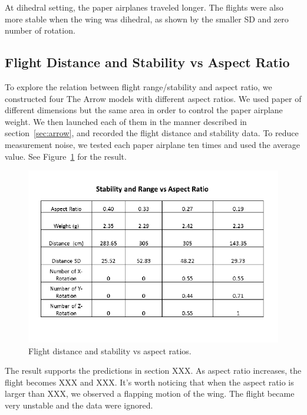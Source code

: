 At dihedral setting, the paper airplanes traveled longer. The flights were also more stable when the wing was dihedral, as shown by the smaller SD and zero number of rotation. 

\subsection{Flight Distance and Stability vs Aspect Ratio}

To explore the relation between flight range/stability and aspect ratio, we constructed four The Arrow models with different aspect ratios. We used paper of
different dimensions but the same area in order to control the paper airplane weight. We then launched each of them in the manner described in section~\ref{sec:arrow}, and recorded the flight distance and stability data. To reduce measurement noise, we tested each paper airplane ten times and used the average value. See Figure~\ref{fig:aspectratioresult} for the result. 


\begin{figure}[hl]
	\centering
		\includegraphics[scale=0.7]{figures/aspectratioresult.png}
		\caption{Flight distance and stability vs aspect ratios.}
	\label{fig:aspectratioresult}
\end{figure}



The result supports the predictions in section XXX. As aspect ratio increases, the flight becomes XXX and XXX. It's worth noticing that when the aspect ratio is larger than XXX, we observed a flapping motion of the wing. The flight became very unstable and the data were ignored.
